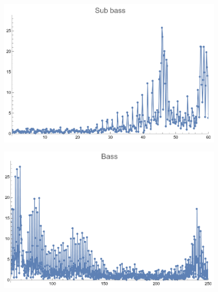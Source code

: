 \documentclass[12pt, letterpaper]{article}
\begin{document}
\begin{figure}[H]
  \centering
  \begin{minipage}{.5\textwidth}
    \centering
    \includegraphics[width=.9\linewidth]{imgs/Cancion6/subbass.png}
    \label{fig:06b}
  \end{minipage}%
  \begin{minipage}{.5\textwidth}
    \centering
    \includegraphics[width=.9\linewidth]{imgs/Cancion6/bass.png}
    \label{fig:06c}
  \end{minipage}
\end{figure}
\end{document}

